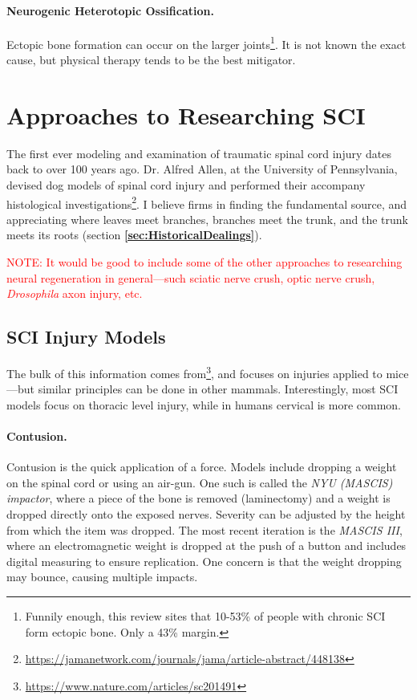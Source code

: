 \documentclass[12pt]{report}
\begin{document}
\subsubsection{Neurogenic Heterotopic Ossification.}
Ectopic bone formation can occur on the larger joints\footnote{Funnily enough, this review sites that 10-53\% of people with chronic SCI form ectopic bone. Only a 43\% margin.}. It is not known the exact cause, but physical therapy tends to be the best mitigator. 




\chapter{Approaches to Researching SCI}

The first ever modeling and examination of traumatic spinal cord injury dates back to over 100 years ago. Dr. Alfred Allen, at the University of Pennsylvania, devised dog models of spinal cord injury and performed their accompany histological investigations\footnote{\url{https://jamanetwork.com/journals/jama/article-abstract/448138}}. I believe firms in finding the fundamental source, and appreciating where leaves meet branches, branches meet the trunk, and the trunk meets its roots (section \textbf{\ref{sec:HistoricalDealings}}).\newline

\textcolor{red}{NOTE: It would be good to include some of the other approaches to researching neural regeneration in general---such sciatic nerve crush, optic nerve crush, \textit{Drosophila} axon injury, etc.}

\section{SCI Injury Models}
The bulk of this information comes from\footnote{\url{https://www.nature.com/articles/sc201491}}, and focuses on injuries applied to mice---but similar principles can be done in other mammals. Interestingly, most SCI models focus on thoracic level injury, while in humans cervical is more common. 

\subsubsection{Contusion.}
Contusion is the quick application of a force. Models include dropping a weight on the spinal cord or using an air-gun. One such is called the \textit{NYU (MASCIS) impactor}, where a piece of the bone is removed (laminectomy) and a weight is dropped directly onto the exposed nerves. Severity can be adjusted by the height from which the item was dropped. The most recent iteration is the \textit{MASCIS III}, where an electromagnetic weight is dropped at the push of a button and includes digital measuring to ensure replication. One concern is that the weight dropping may bounce, causing multiple impacts.\newline
\end{document}
